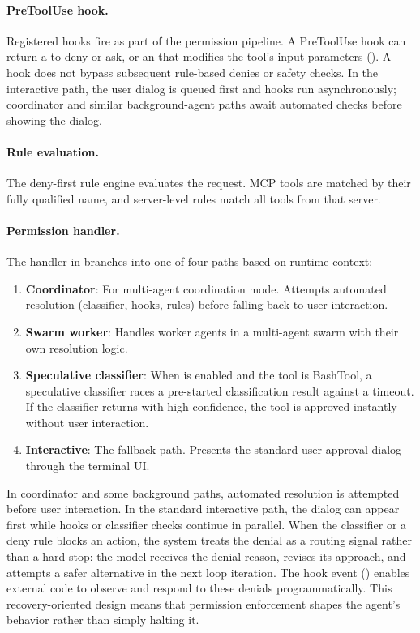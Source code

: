 \paragraph{PreToolUse hook.}
Registered hooks fire as part of the permission pipeline. A PreToolUse hook can return a  to deny or ask, or an  that modifies the tool's input parameters (). A hook  does not bypass subsequent rule-based denies or safety checks. In the interactive path, the user dialog is queued first and hooks run asynchronously; coordinator and similar background-agent paths await automated checks before showing the dialog.

\paragraph{Rule evaluation.}
The deny-first rule engine evaluates the request. MCP tools are matched by their fully qualified  name, and server-level rules match all tools from that server.

\paragraph{Permission handler.}
The handler in  branches into one of four paths based on runtime context:

\begin{enumerate}[nosep]
  \item \textbf{Coordinator}: For multi-agent coordination mode. Attempts automated resolution (classifier, hooks, rules) before falling back to user interaction.
  \item \textbf{Swarm worker}: Handles worker agents in a multi-agent swarm with their own resolution logic.
  \item \textbf{Speculative classifier}: When  is enabled and the tool is BashTool, a speculative classifier races a pre-started classification result against a timeout. If the classifier returns with high confidence, the tool is approved instantly without user interaction.
  \item \textbf{Interactive}: The fallback path. Presents the standard user approval dialog through the terminal UI.
\end{enumerate}

In coordinator and some background paths, automated resolution is attempted before user interaction. In the standard interactive path, the dialog can appear first while hooks or classifier checks continue in parallel. When the classifier or a deny rule blocks an action, the system treats the denial as a routing signal rather than a hard stop: the model receives the denial reason, revises its approach, and attempts a safer alternative in the next loop iteration. The  hook event () enables external code to observe and respond to these denials programmatically. This recovery-oriented design means that permission enforcement shapes the agent's behavior rather than simply halting it.

